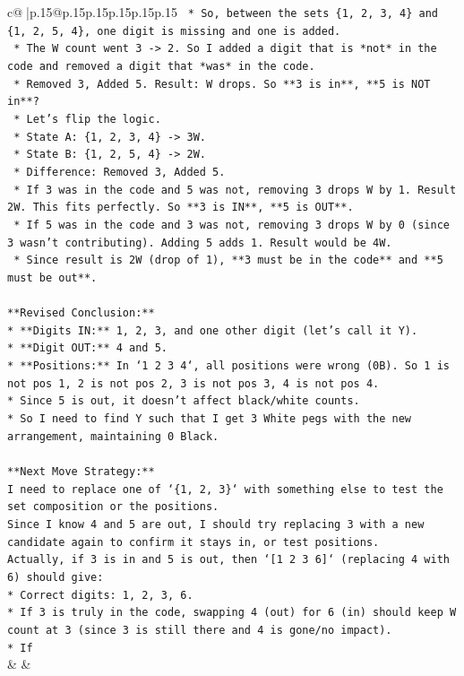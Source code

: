 \documentclass{article}
\begin{document}
{\begin{supertabular}{c@{$\;$}|p{.15\linewidth}@{}p{.15\linewidth}p{.15\linewidth}p{.15\linewidth}p{.15\linewidth}p{.15\linewidth}}
{{{\texttt{    *   So, between the sets \{1, 2, 3, 4\} and \{1, 2, 5, 4\}, one digit is missing and one is added.} \\
\texttt{    *   The W count went 3 {-}> 2. So I added a digit that is *not* in the code and removed a digit that *was* in the code.} \\
\texttt{    *   Removed 3, Added 5. Result: W drops. So **3 is in**, **5 is NOT in**?} \\
\texttt{    *   Let's flip the logic.} \\
\texttt{        *   State A: \{1, 2, 3, 4\} {-}> 3W.} \\
\texttt{        *   State B: \{1, 2, 5, 4\} {-}> 2W.} \\
\texttt{        *   Difference: Removed 3, Added 5.} \\
\texttt{        *   If 3 was in the code and 5 was not, removing 3 drops W by 1. Result 2W. This fits perfectly. So **3 is IN**, **5 is OUT**.} \\
\texttt{        *   If 5 was in the code and 3 was not, removing 3 drops W by 0 (since 3 wasn't contributing). Adding 5 adds 1. Result would be 4W.} \\
\texttt{        *   Since result is 2W (drop of 1), **3 must be in the code** and **5 must be out**.} \\
\\ 
\texttt{**Revised Conclusion:**} \\
\texttt{*   **Digits IN:** 1, 2, 3, and one other digit (let's call it Y).} \\
\texttt{*   **Digit OUT:** 4 and 5.} \\
\texttt{*   **Positions:** In `1 2 3 4`, all positions were wrong (0B). So 1 is not pos 1, 2 is not pos 2, 3 is not pos 3, 4 is not pos 4.} \\
\texttt{*   Since 5 is out, it doesn't affect black/white counts.} \\
\texttt{*   So I need to find Y such that I get 3 White pegs with the new arrangement, maintaining 0 Black.} \\
\\ 
\texttt{**Next Move Strategy:**} \\
\texttt{I need to replace one of `\{1, 2, 3\}` with something else to test the set composition or the positions.} \\
\texttt{Since I know 4 and 5 are out, I should try replacing 3 with a new candidate again to confirm it stays in, or test positions.} \\
\texttt{Actually, if 3 is in and 5 is out, then `{[}1 2 3 6{]}` (replacing 4 with 6) should give:} \\
\texttt{*   Correct digits: 1, 2, 3, 6.} \\
\texttt{*   If 3 is truly in the code, swapping 4 (out) for 6 (in) should keep W count at 3 (since 3 is still there and 4 is gone/no impact).} \\
\texttt{*   If} \\
            }
        }
    }
    & & \\ \\


\end{supertabular}}
\end{document}
